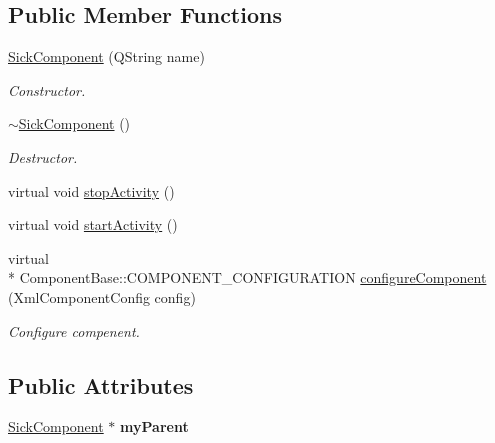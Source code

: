 \subsection*{Public Member Functions}
\begin{DoxyCompactItemize}
\item 
\hypertarget{classpacpus_1_1SickComponent_a173293f307240ec6872d5be9a8790c56}{\hyperlink{classpacpus_1_1SickComponent_a173293f307240ec6872d5be9a8790c56}{Sick\-Component} (Q\-String name)}\label{classpacpus_1_1SickComponent_a173293f307240ec6872d5be9a8790c56}

\begin{DoxyCompactList}\small\item\em Constructor. \end{DoxyCompactList}\item 
\hypertarget{classpacpus_1_1SickComponent_a318cc1a398812c71a47661b22ff36e22}{\hyperlink{classpacpus_1_1SickComponent_a318cc1a398812c71a47661b22ff36e22}{$\sim$\-Sick\-Component} ()}\label{classpacpus_1_1SickComponent_a318cc1a398812c71a47661b22ff36e22}

\begin{DoxyCompactList}\small\item\em Destructor. \end{DoxyCompactList}\item 
virtual void \hyperlink{classpacpus_1_1SickComponent_a4524cb582e5fdf9dbd059072bea0d49b}{stop\-Activity} ()
\item 
virtual void \hyperlink{classpacpus_1_1SickComponent_a93980139bab330f3ef6bf818afba70a2}{start\-Activity} ()
\item 
virtual \\*
Component\-Base\-::\-C\-O\-M\-P\-O\-N\-E\-N\-T\-\_\-\-C\-O\-N\-F\-I\-G\-U\-R\-A\-T\-I\-O\-N \hyperlink{classpacpus_1_1SickComponent_accc413cdd2c4f5b8aacb14655b8a86d2}{configure\-Component} (Xml\-Component\-Config config)
\begin{DoxyCompactList}\small\item\em Configure compenent. \end{DoxyCompactList}\end{DoxyCompactItemize}
\subsection*{Public Attributes}
\begin{DoxyCompactItemize}
\item 
\hypertarget{classpacpus_1_1SickComponent_a4ac4764e115fb41e6e9df77e05bcb14f}{\hyperlink{classpacpus_1_1SickComponent}{Sick\-Component} $\ast$ {\bfseries my\-Parent}}\label{classpacpus_1_1SickComponent_a4ac4764e115fb41e6e9df77e05bcb14f}

\end{DoxyCompactItemize}


